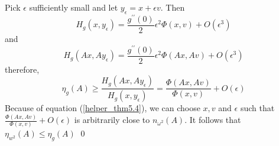 Pick $\epsilon$ sufficiently small and let $y_\epsilon = x + \epsilon v$. Then \[H_g(x, y_\epsilon) = \frac{g^{\prime\prime}(0)}{2}\epsilon^2 \Phi(x,v) + O(\epsilon^3)\] and 
\[H_g(Ax, Ay_\epsilon) = \frac{g^{\prime\prime}(0)}{2}\epsilon^2 \Phi(Ax,Av) + O(\epsilon^3)\] therefore,
\[\eta_g(A) \geq \frac{H_g(Ax, Ay_\epsilon)}{H_g(x, y_\epsilon)}=\frac{\Phi(Ax, Av)}{\Phi(x,v)} + O(\epsilon)\]
Because of equation (\ref{helper_thm5.4}), we can choose $x, v$ and $\epsilon$ such that $\frac{\Phi(Ax, Av)}{\Phi(x,v)} + O(\epsilon)$ is arbitrarily close to $n_{\omega^2}(A)$. It follows that $\eta_{w^2}(A) \leq \eta_g(A)$ \qed
\addtocounter{section}{-2}

